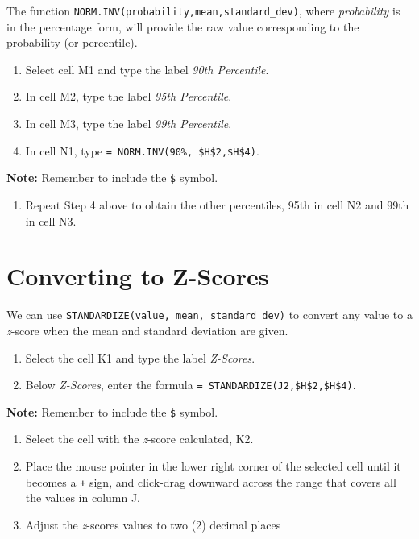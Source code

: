 \documentclass[
]{book}
\providecommand{\tightlist}{%
  \setlength{\itemsep}{0pt}\setlength{\parskip}{0pt}}
\begin{document}
The function \texttt{NORM.INV(probability,mean,standard\_dev)}, where \emph{probability} is in the percentage form, will provide the raw value corresponding to the probability (or percentile).

\begin{enumerate}
\def\labelenumi{\arabic{enumi}.}
\tightlist
\item
  Select cell M1 and type the label \emph{90th Percentile}.
\item
  In cell M2, type the label \emph{95th Percentile}.
\item
  In cell M3, type the label \emph{99th Percentile}.
\item
  In cell N1, type \texttt{=\ NORM.INV(90\%,\ \$H\$2,\$H\$4)}.
\end{enumerate}

\textbf{Note:} Remember to include the \texttt{\$} symbol.

\begin{enumerate}
\def\labelenumi{\arabic{enumi}.}
\setcounter{enumi}{4}
\tightlist
\item
  Repeat Step 4 above to obtain the other percentiles, 95th in cell N2 and 99th in cell N3.
\end{enumerate}

\hypertarget{converting-to-z-scores-1}{%
\section{Converting to Z-Scores}\label{converting-to-z-scores-1}}

We can use \texttt{STANDARDIZE(value,\ mean,\ standard\_dev)} to convert any value to a \emph{z}-score when the mean and standard deviation are given.

\begin{enumerate}
\def\labelenumi{\arabic{enumi}.}
\tightlist
\item
  Select the cell K1 and type the label \emph{Z-Scores}.
\item
  Below \emph{Z-Scores}, enter the formula \texttt{=\ STANDARDIZE(J2,\$H\$2,\$H\$4)}.
\end{enumerate}

\textbf{Note:} Remember to include the \texttt{\$} symbol.

\begin{enumerate}
\def\labelenumi{\arabic{enumi}.}
\setcounter{enumi}{2}
\tightlist
\item
  Select the cell with the \emph{z}-score calculated, K2.
\item
  Place the mouse pointer in the lower right corner of the selected cell until it becomes a \texttt{+} sign, and click-drag downward across the range that covers all the values in column J.
\item
  Adjust the \emph{z}-scores values to two (2) decimal places
\end{enumerate}
\end{document}
